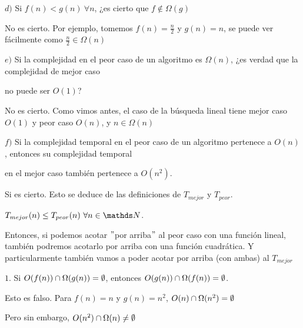 \documentclass[10pt,a4paper]{article}
\begin{document}
\demoline
\demoline
\par $d)$ Si \ensuremath{f(n) < g(n)\ \forall n}, ¿es cierto que \ensuremath{f \notin \Omega(g)}
\demoline
\begin{groupIzq}{2.5em}
  \par No es cierto. Por ejemplo, tomemos \ensuremath{f(n) = \frac{n}{2}} y \ensuremath{g(n) = n}, se puede ver fácilmente como
  \ensuremath{\frac{n}{2} \in \Omega(n)}
\end{groupIzq}

\demoline
\demoline
\par $e)$ Si la complejidad en el peor caso de un algoritmo es \ensuremath{\Omega(n)}, ¿es verdad que la complejidad de mejor caso
\par \hspace{0.85em} no puede ser \ensuremath{O(1)}?
\demoline
\begin{groupIzq}{2.5em}
  \par No es cierto. Como vimos antes, el caso de la búsqueda lineal tiene mejor caso \ensuremath{O(1)} y peor caso \ensuremath{O(n)}, y \ensuremath{n \in \Omega(n)}
\end{groupIzq}

\demoline
\demoline
\par $f)$ Si la complejidad temporal en el peor caso de un algoritmo pertenece a \ensuremath{O(n)}, entonces su complejidad temporal \par \hspace{0.85em} en el mejor caso también pertenece a \ensuremath{O(n^2)}.
\demoline
\begin{groupIzq}{2.5em}
  \par Si es cierto. Esto se deduce de las definiciones de \ensuremath{T_{mejor}} y \ensuremath{T_{peor}}.
  \par \ensuremath{T_{mejor}(n) \leq T_{peor}(n)\ \forall n \in \nat}.
  \par Entonces, si podemos acotar $"$por arriba$"$ al peor caso con una función lineal, también podremos acotarlo por arriba con una función cuadrática. Y particularmente también vamos a poder acotar por arriba (con ambas) al \ensuremath{T_{mejor}}
\end{groupIzq}

\newpage

\demoline
\par $1.$ Si \ensuremath{O(f(n)) \interseccion \Omega(g(n)) = \emptyset}, entonces \ensuremath{O(g(n)) \interseccion \Omega(f(n)) = \emptyset}.
\demoline
\begin{groupIzq}{2.5em}
  \par Esto es falso. Para \ensuremath{f(n) = n} y \ensuremath{g(n) = n^2}, \ensuremath{O(n) \interseccion \Omega(n^2) = \emptyset}
  \par Pero sin embargo, \ensuremath{O(n^2) \interseccion \Omega(n) \neq \emptyset}
\end{groupIzq}
\end{document}
